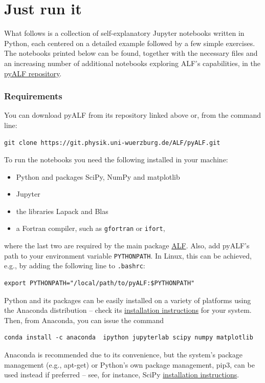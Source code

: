 \documentclass[10pt,modern]{scrartcl}
\numberwithin{exerciseitem}{exercise} %
\begin{document}
\part{Just run it}

What follows is a collection of self-explanatory Jupyter notebooks written in Python, each centered on a detailed example followed by a few simple exercises. The notebooks printed below can be found, together with the necessary files and an increasing number of additional notebooks exploring ALF's capabilities, in the \href{https://git.physik.uni-wuerzburg.de/ALF/pyALF}{pyALF repository}.


\section*{Requirements}

You can download pyALF from its repository linked above or, from the command line:
\begin{lstlisting}[style=bash]
git clone https://git.physik.uni-wuerzburg.de/ALF/pyALF.git
\end{lstlisting}
To run the notebooks you need the following installed in your machine:
\begin{itemize}
	\item Python and packages SciPy, NumPy and matplotlib
	\item Jupyter
	\item the libraries Lapack and Blas
	\item a Fortran compiler, such as \texttt{gfortran} or \texttt{ifort},
\end{itemize}
where the last two are required by the main package \href{https://git.physik.uni-wuerzburg.de:ALF}{ALF}. %
Also, add pyALF's path to your environment variable \texttt{PYTHONPATH}. In Linux, this can be achieved, e.g., by adding the following line to \texttt{.bashrc}:
\begin{lstlisting}[style=bash]
export PYTHONPATH="/local/path/to/pyALF:$PYTHONPATH"
\end{lstlisting}

Python and its packages can be easily installed on a variety of platforms using the Anaconda distribution -- check its \href{https://docs.anaconda.com/anaconda/install/}{installation instructions} for your system. Then, from Anaconda, you can issue the command
\begin{lstlisting}[style=bash]
conda install -c anaconda  ipython jupyterlab scipy numpy matplotlib
\end{lstlisting}
Anaconda is recommended due to its convenience, but the system's package management (e.g., apt-get) or Python's own package management, pip3, can be used instead if preferred -- see, for instance, SciPy \href{https://www.scipy.org/install.html}{installation instructions}.
\end{document}
